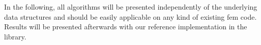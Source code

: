In the following, all algorithms will be presented independently of the underlying data structures and should be easily applicable on any kind of existing \gls{fem} code. Results will be presented afterwards with our reference implementation in the \dealii{} library.










